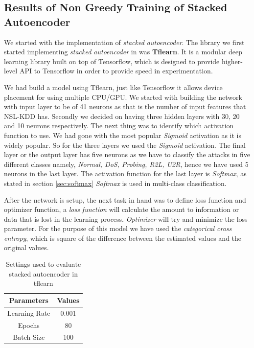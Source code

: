 \documentclass[12pt, a4paper]{report}
\begin{document}
\begin{appendices}
  \chapter{Results of Non Greedy Training of Stacked Autoencoder}\label{app:super}
 We started with the implementation of \textit{stacked autoencoder}. The library we first started implementing \textit{stacked autoencoder} in was \textbf{Tflearn}. It is a modular deep learning library built on top of Tensorflow, which is designed to provide higher-level API to Tensorflow in order to provide speed in experimentation.\\ \par

We had build a model using Tflearn, just like Tensorflow it allows device placement for using multiple CPU/GPU. We started with building the network with input layer to be of 41 neurons as that is the number of input features that NSL-KDD has. Secondly we decided on having three hidden layers with 30, 20 and 10 neurons respectively. The next thing was to identify which activation function to use. We had gone with the most popular \textit{Sigmoid} activation as it is widely popular. So for the three layers we used the \textit{Sigmoid} activation. The final layer or the output layer has five neurons as we have to classify the attacks in five different classes namely, \textit{Normal, DoS, Probing, R2L, U2R}, hence we have used 5 neurons in the last layer. The activation function for the last layer is \textit{Softmax}, as stated in section \ref{sec:softmax} \textit{Softmax} is used in multi-class classification.\\ \par

After the network is setup, the next task in hand was to define loss function and optimizer function, a \textit{loss function} will calculate the amount to information or data that is lost in the learning process. \textit{Optimizer} will try and minimize the loss parameter. For the purpose of this model we have used the \textit{categorical cross entropy}, which is square of the difference between the estimated values and the original values. \\ \par
\begin{table}[ht]
\centering
\captionsetup{justification=centering,margin=2cm}
\begin{tabular}{|c|c|}
\hline
\textbf{Parameters} & \textbf{Values} \\ \hline
Learning Rate       & 0.001           \\ \hline
Epochs              & 80              \\ \hline
Batch Size          & 100             \\ \hline
\end{tabular}
\caption{Settings used to evaluate stacked autoencoder in tflearn}
\label{setting_tflearn_autoencoder}
\end{table}
\clearpage

\end{appendices}
\end{document}

